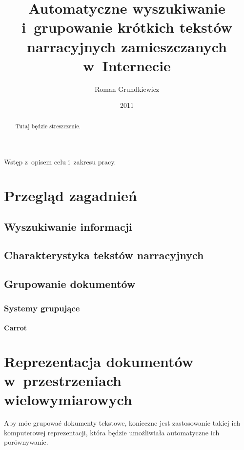 \documentclass[skorowidz, autorrok, backref, xodstep]{wmimgr}
\author   {Roman Grundkiewicz}
\title    {Automatyczne wyszukiwanie i~grupowanie krótkich tekstów narracyjnych zamieszczanych w~Internecie}
\date     {2011}
\begin{document}

\begin{abstract}
  Tutaj będzie streszczenie.
\end{abstract}
	

\maketitle

\introduction
Wstęp z~opisem celu i~zakresu pracy.

\chapter{Przegląd zagadnień}
	\section{Wyszukiwanie informacji}
	\section{Charakterystyka tekstów narracyjnych}
	\section{Grupowanie dokumentów}
	
	
		\subsection{Systemy grupujące}
		\subsubsection{Carrot}
	
\chapter{Reprezentacja dokumentów w~przestrzeniach wielowymiarowych}

Aby móc grupować dokumenty tekstowe, konieczne jest zastosowanie takiej ich komputerowej reprezentacji, 
która będzie umożliwiała automatyczne ich porównywanie.
\end{document}
